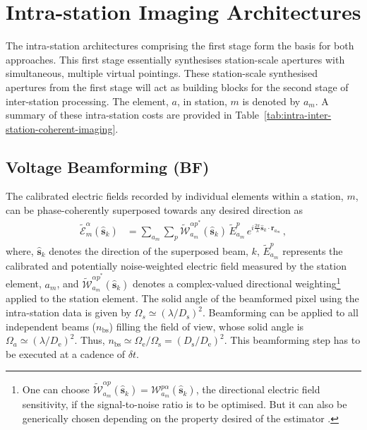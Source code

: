 \documentclass[
  journal=pasa,
  manuscript=article-type,
  year=2020,
  volume=37,
]{cup-journal}
\begin{document}
\section{Intra-station Imaging Architectures} \label{sec:intra-station-arch}

The intra-station architectures comprising the first stage form the basis for both approaches. This first stage essentially synthesises station-scale apertures with simultaneous, multiple virtual pointings. These station-scale synthesised apertures from the first stage will act as building blocks for the second stage of inter-station processing. The element, $a$, in station, $m$ is denoted by $a_m$. A summary of these intra-station costs are provided in Table~\ref{tab:intra-inter-station-coherent-imaging}. 

\subsection{Voltage Beamforming (BF)}

The calibrated electric fields recorded by individual elements within a station, $m$, can be phase-coherently superposed towards any desired direction as
\begin{align}
    \widetilde{\mathcal{E}}_m^\alpha(\hat{\boldsymbol{s}}_k) &= \sum_{a_m} \sum_p  \widetilde{\mathcal{W}}_{a_m}^{{\alpha p}^*}(\hat{\boldsymbol{s}}_k) \, \widetilde{E}_{a_m}^p \, e^{i\frac{2\pi}{\lambda} \hat{\boldsymbol{s}}_k\cdot\boldsymbol{r}_{a_m}} \, , \label{eqn:intra-station-pol-hol-img-expl}
\end{align}
where, $\hat{\boldsymbol{s}}_k$ denotes the direction of the superposed beam, $k$, $\widetilde{E}_{a_m}^{p}$ represents the calibrated and potentially noise-weighted electric field measured by the station element, $a_m$, and $\widetilde{\mathcal{W}}_{a_m}^{{\alpha p}^*}(\hat{\boldsymbol{s}}_k)$ denotes a complex-valued directional weighting\footnote{One can choose $\widetilde{\mathcal{W}}_{a_m}^{\alpha p}(\hat{\boldsymbol{s}}_k)=\mathcal{W}_{a_m}^{p\alpha}(\hat{\boldsymbol{s}}_k)$, the directional electric field sensitivity, if the signal-to-noise ratio is to be optimised. But it can also be generically chosen depending on the property desired of the estimator \cite[][]{Morales2011}.} applied to the station element. The solid angle of the beamformed pixel using the intra-station data is given by $\Omega_s \simeq (\lambda/D_\textrm{s})^2$. Beamforming can be applied to all independent beams ($n_\textrm{bs}$) filling the field of view, whose solid angle is $\Omega_a \simeq (\lambda/D_\textrm{e})^2$. Thus, $n_\textrm{bs} \simeq \Omega_\textrm{e}/\Omega_\textrm{s}=(D_\textrm{s}/D_\textrm{e})^2$. This beamforming step has to be executed at a cadence of $\delta t$. 
\end{document}
